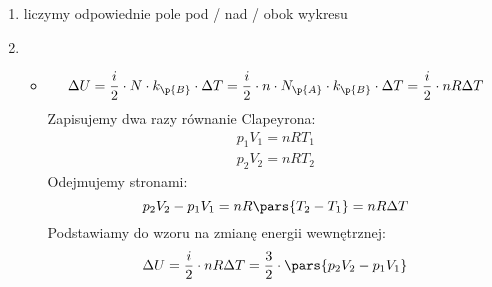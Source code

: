 \begin{enumerate}[label={\alph*)}]
    \item liczymy odpowiednie pole pod / nad / obok wykresu
    \item
        \begin{itemize}
            \item
                \begin{equation*}
                    \Delta U = \frac{i}{2} \cdot N \cdot k_\p{B} \cdot \Delta T
                        = \frac{i}{2} \cdot n \cdot N_\p{A} \cdot k_\p{B} \cdot \Delta T = \frac{i}{2} \cdot nR \Delta T
                \end{equation*}
                Zapisujemy dwa razy równanie Clapeyrona:
                \begin{gather*}
                    p_1V_1 = nRT_1\\
                    p_2V_2 = nRT_2
                \end{gather*}
                Odejmujemy stronami:
                \begin{equation*}
                    p_2V_2 - p_1V_1 = nR\pars{T_2 - T_1} = nR \Delta T
                \end{equation*}
                Podstawiamy do wzoru na zmianę energii wewnętrznej:
                \begin{equation*}
                    \Delta U = \frac{i}{2} \cdot nR \Delta T
                        = \frac{3}{2} \cdot \pars{p_2V_2 - p_1V_1}
                \end{equation*}
        \end{itemize}
\end{enumerate}
